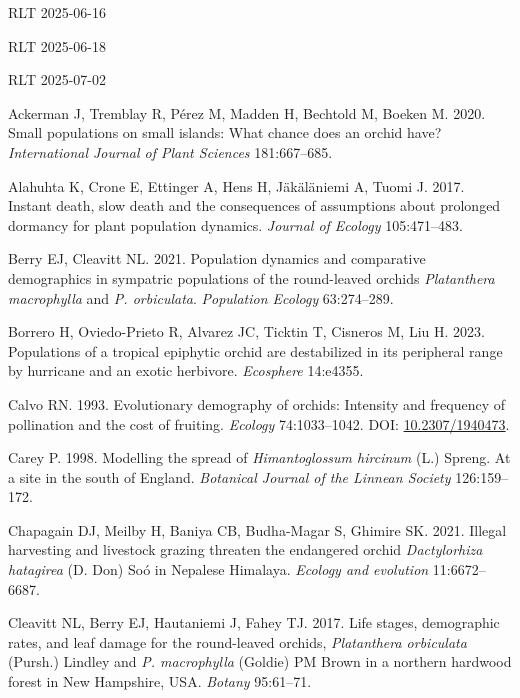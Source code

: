 \documentclass[
  12pt,
  letterpaper,
]{book}
\newlength{\cslhangindent}
\newenvironment{CSLReferences}[2] %
 {\begin{list}{}{%
  \setlength{\itemindent}{0pt}
  \setlength{\leftmargin}{0pt}
  \setlength{\parsep}{0pt}
  \ifodd #1
   \setlength{\leftmargin}{\cslhangindent}
   \setlength{\itemindent}{-1\cslhangindent}
  \fi
  \setlength{\itemsep}{#2\baselineskip}}}
 {\end{list}}
\begin{document}
RLT 2025-06-16

RLT 2025-06-18

RLT 2025-07-02

\label{refs}
\begin{CSLReferences}{1}{0}
Ackerman J, Tremblay R, Pérez M, Madden H, Bechtold M, Boeken M. 2020.
Small populations on small islands: What chance does an orchid have?
\emph{International Journal of Plant Sciences} 181:667--685.

Alahuhta K, Crone E, Ettinger A, Hens H, Jäkäläniemi A, Tuomi J. 2017.
Instant death, slow death and the consequences of assumptions about
prolonged dormancy for plant population dynamics. \emph{Journal of
Ecology} 105:471--483.

Berry EJ, Cleavitt NL. 2021. Population dynamics and comparative
demographics in sympatric populations of the round-leaved orchids
\emph{{P}latanthera {m}acrophylla} and \emph{{P}. {o}rbiculata}.
\emph{Population Ecology} 63:274--289.

Borrero H, Oviedo-Prieto R, Alvarez JC, Ticktin T, Cisneros M, Liu H.
2023. Populations of a tropical epiphytic orchid are destabilized in its
peripheral range by hurricane and an exotic herbivore. \emph{Ecosphere}
14:e4355.

Calvo RN. 1993. Evolutionary demography of orchids: Intensity and
frequency of pollination and the cost of fruiting. \emph{Ecology}
74:1033--1042. DOI:
\href{https://doi.org/10.2307/1940473}{10.2307/1940473}.

Carey P. 1998. Modelling the spread of \emph{{H}imantoglossum
{h}ircinum} ({L}.) {S}preng. At a site in the south of {E}ngland.
\emph{Botanical Journal of the Linnean Society} 126:159--172.

Chapagain DJ, Meilby H, Baniya CB, Budha-Magar S, Ghimire SK. 2021.
Illegal harvesting and livestock grazing threaten the endangered orchid
\emph{{D}actylorhiza {h}atagirea} ({D}. {D}on) {S}o{ó} in {N}epalese
{H}imalaya. \emph{Ecology and evolution} 11:6672--6687.

Cleavitt NL, Berry EJ, Hautaniemi J, Fahey TJ. 2017. Life stages,
demographic rates, and leaf damage for the round-leaved orchids,
\emph{{P}latanthera {o}rbiculata} ({P}ursh.) {L}indley and \emph{{P}.
{m}acrophylla} ({G}oldie) {PM} {B}rown in a northern hardwood forest in
{N}ew {H}ampshire, USA. \emph{Botany} 95:61--71.


\end{CSLReferences}
\end{document}
